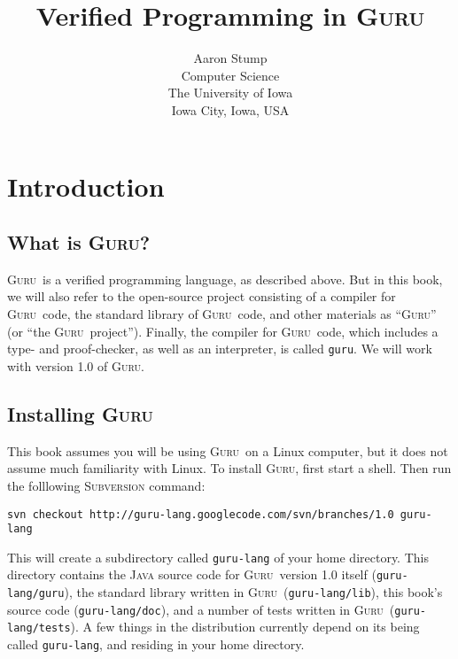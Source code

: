 \documentclass{book}[12pt]
\newcommand{\guru}[0]{\textsc{Guru}}
\begin{document}
\title{Verified Programming in \guru}

\author{Aaron Stump \\
Computer Science \\
The University of Iowa \\
Iowa City, Iowa, USA
}

\maketitle

\tableofcontents

\chapter{Introduction}
\label{ch1}

\section{What is \guru?}

\guru\ is a verified programming language, as described above.  But in
this book, we will also refer to the open-source project consisting of
a compiler for \guru\ code, the standard library of \guru\ code, and
other materials as ``\guru'' (or ``the \guru\ project'').  Finally,
the compiler for \guru\ code, which includes a type- and
proof-checker, as well as an interpreter, is called \texttt{guru}.  We
will work with version 1.0 of \guru.

\section{Installing \guru}

This book assumes you will be using \guru\ on a Linux computer, but it
does not assume much familiarity with Linux.  To install \guru, first
start a shell. Then run the folllowing \textsc{Subversion} command:

\begin{verbatim}
svn checkout http://guru-lang.googlecode.com/svn/branches/1.0 guru-lang
\end{verbatim}

\noindent This will create a subdirectory called \texttt{guru-lang} of
your home directory.  This directory contains the \textsc{Java} source
code for \guru\ version 1.0 itself (\texttt{guru-lang/guru}), the
standard library written in \guru\ (\texttt{guru-lang/lib}), this
book's source code (\texttt{guru-lang/doc}), and a number of tests
written in \guru\ (\texttt{guru-lang/tests}).  A few things in the
distribution currently depend on its being called \texttt{guru-lang},
and residing in your home directory.
\end{document}
